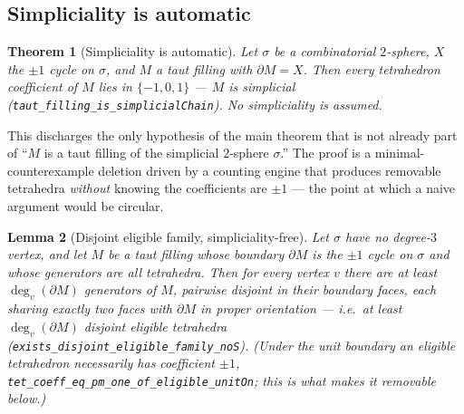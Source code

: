 \documentclass[11pt]{article}
\theoremstyle{plain}
\newtheorem{theorem}{Theorem}[section]
\newtheorem{lemma}[theorem]{Lemma}
\theoremstyle{definition}
\theoremstyle{remark}
\newcommand{\bd}{\partial}
\newcommand{\code}[1]{\texttt{#1}}
\begin{document}
\subsection*{Simpliciality is automatic}

\begin{theorem}[Simpliciality is automatic]\label{thm:simpl}
Let $\sigma$ be a combinatorial $2$-sphere, $X$ the $\pm1$ cycle on $\sigma$, and $M$ a taut
filling with $\bd M=X$. Then every tetrahedron coefficient of $M$ lies in $\{-1,0,1\}$ --- $M$
is simplicial (\code{taut\_filling\_is\_simplicialChain}). \emph{No simpliciality is assumed.}
\end{theorem}

This discharges the only hypothesis of the main theorem that is not already part of ``$M$ is a
taut filling of the simplicial $2$-sphere $\sigma$.'' The proof is a minimal-counterexample
deletion driven by a counting engine that produces removable tetrahedra \emph{without} knowing
the coefficients are $\pm1$ --- the point at which a naive argument would be circular.

\begin{lemma}[Disjoint eligible family, simpliciality-free]\label{lem:family}
Let $\sigma$ have no degree-$3$ vertex, and let $M$ be a taut filling whose boundary $\bd M$ is
the $\pm1$ cycle on $\sigma$ and whose generators are all tetrahedra. Then for every vertex
$v$ there are at least $\deg_v(\bd M)$ generators of $M$, pairwise disjoint in their boundary
faces, each sharing exactly two faces with $\bd M$ in proper orientation --- i.e.\ at least
$\deg_v(\bd M)$ disjoint \emph{eligible} tetrahedra
(\code{exists\_disjoint\_eligible\_family\_noS}). (Under the unit boundary an eligible
tetrahedron necessarily has coefficient $\pm1$,
\code{tet\_coeff\_eq\_pm\_one\_of\_eligible\_unitOn}; this is what makes it removable below.)
\end{lemma}
\end{document}
